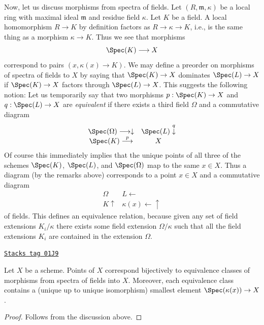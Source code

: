 Now, let us discuss morphisms from spectra of fields.
Let $(R, \mathfrak m, \kappa)$ be a local ring
with maximal ideal $\mathfrak m$ and residue field $\kappa$.
Let $K$ be a field. A local homomorphism $R \to K$ by definition
factors as $R \to \kappa \to K$, i.e., is the same thing as
a morphism $\kappa \to K$. Thus we see that morphisms
$$
\Spec(K) \longrightarrow X
$$
correspond to pairs $(x, \kappa(x) \to K)$. We may define
a preorder on morphisms of spectra of fields to $X$
by saying that $\Spec(K) \to X$ dominates
$\Spec(L) \to X$ if $\Spec(K) \to X$
factors through $\Spec(L) \to X$. This suggests
the following notion: Let us temporarily
say that two morphisms $p : \Spec(K) \to X$ and
$q : \Spec(L) \to X$ are {\it equivalent} if there exists
a third field $\Omega$ and a commutative diagram
$$
\begin{array}{cc}\Spec(\Omega) \longrightarrow\downarrow & \Spec(L) \overset{q}{\downarrow} \\ \Spec(K) \overset{p}{\longrightarrow} & X\end{array}
$$
Of course this immediately implies that the unique points of
all three of the schemes $\Spec(K)$,
$\Spec(L)$, and $\Spec(\Omega)$
map to the same $x \in X$. Thus a diagram (by the remarks above)
corresponds to a point $x \in X$ and a commutative diagram
$$
\begin{array}{cc}\Omega & L \longleftarrow \\ K \uparrow & \kappa(x) \longleftarrow\uparrow\end{array}
$$
of fields. This defines an equivalence relation, because given
any set of field extensions $K_i/\kappa$ there exists
some field extension $\Omega/\kappa$ such that all
the field extensions $K_i$ are contained in the extension $\Omega$.

\begin{lemma}
\label{schemes-lemma-characterize-points}
\href{https://stacks.math.columbia.edu/tag/01J9}{\texttt{Stacks tag 01J9}}

Let $X$ be a scheme. Points of $X$ correspond bijectively
to equivalence classes of morphisms from spectra of
fields into $X$. Moreover, each equivalence class contains
a (unique up to unique isomorphism) smallest element
$\Spec(\kappa(x)) \to X$.
\end{lemma}

\begin{proof}
Follows from the discussion above.
\end{proof}

